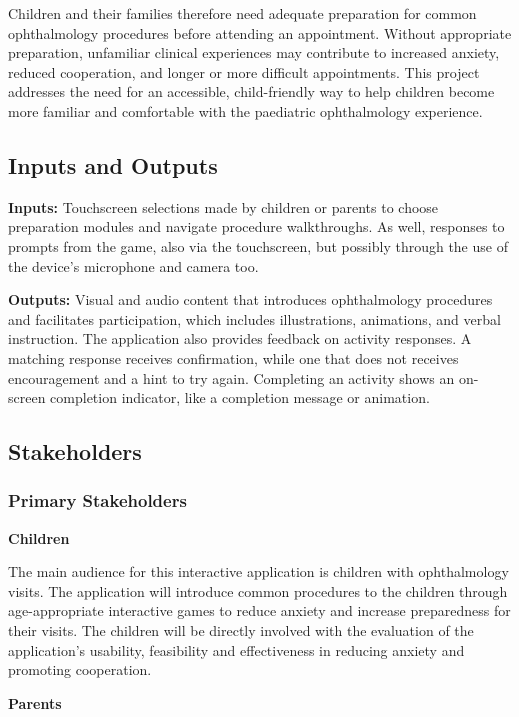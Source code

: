 \documentclass{article}
\begin{document}
Children and their families therefore need adequate preparation for common ophthalmology procedures before attending an appointment.
Without appropriate preparation, unfamiliar clinical experiences may contribute to increased anxiety, reduced cooperation, and longer or more difficult appointments.
This project addresses the need for an accessible, child-friendly way to help children become more familiar and comfortable with the paediatric ophthalmology experience.

\subsection{Inputs and Outputs}

\textbf{Inputs:} Touchscreen selections made by children or parents to
choose preparation modules and navigate procedure walkthroughs. As well, responses
to prompts from the game, also via the touchscreen, but possibly through the use of the device's
microphone and camera too.

\textbf{Outputs:} Visual and audio content that introduces ophthalmology procedures
and facilitates participation, which includes illustrations, animations, and verbal
instruction. The application also provides feedback on activity responses. A matching
response receives confirmation, while one that does not receives
encouragement and a hint to try again. Completing an activity shows an
on-screen completion indicator, like a completion message or animation.

\subsection{Stakeholders}
    \subsubsection{Primary Stakeholders}
        \textbf{Children}

        The main audience for this interactive application is children with 
        ophthalmology visits. The application will introduce common procedures 
        to the children through age-appropriate interactive games to reduce anxiety 
        and increase preparedness for their visits. The children will be directly 
        involved with the evaluation of the application's usability, feasibility 
        and effectiveness in reducing anxiety and promoting cooperation.

        \textbf{Parents}
\end{document}
